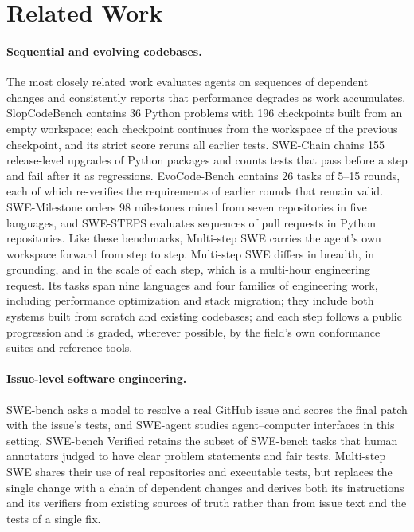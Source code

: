 \documentclass{article}
\newcommand{\bench}{Multi-step SWE\xspace}
\begin{document}
\section{Related Work}
\label{sec:related}

\paragraph{Sequential and evolving codebases.}
The most closely related work evaluates agents on sequences of dependent
changes and consistently reports that performance degrades as work
accumulates. SlopCodeBench \citep{orlanski2026slopcodebench} contains 36 Python
problems with 196 checkpoints built from an empty workspace; each checkpoint
continues from the workspace of the previous checkpoint, and its strict score
reruns all earlier tests. SWE-Chain \citep{lam2026swechain} chains 155
release-level upgrades of Python packages and counts tests that pass before a
step and fail after it as regressions. EvoCode-Bench
\citep{shen2026evocodebench} contains 26 tasks of 5--15 rounds, each of which
re-verifies the requirements of earlier rounds that remain valid.
SWE-Milestone \citep{deng2026swemilestone} orders 98 milestones mined from
seven repositories in five languages, and SWE-STEPS \citep{shastry2026swesteps}
evaluates sequences of pull requests in Python repositories. Like these
benchmarks, \bench carries the agent's own workspace forward from step to step.
\bench differs in breadth, in grounding, and in the scale of each step, which
is a multi-hour engineering request. Its tasks span nine languages and four
families of engineering work, including performance optimization and stack
migration; they include both systems built from scratch and existing
codebases; and each step follows a public progression and is graded, wherever
possible, by the field's own conformance suites and reference tools.

\paragraph{Issue-level software engineering.}
SWE-bench \citep{jimenez2023swebench} asks a model to resolve a real GitHub
issue and scores the final patch with the issue's tests, and SWE-agent
\citep{yang2024sweagent} studies agent--computer interfaces in this setting.
SWE-bench Verified \citep{openai2024swebenchverified} retains the subset of
SWE-bench tasks that human annotators judged to have clear problem statements
and fair tests. \bench shares their use of real repositories and executable
tests, but replaces the single change with a chain of dependent changes and
derives both its instructions and its verifiers from existing sources of truth
rather than from issue text and the tests of a single fix.
\end{document}
